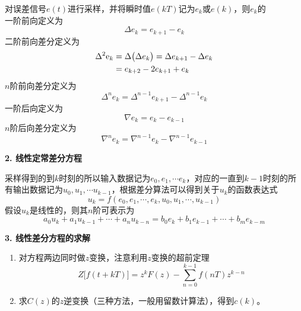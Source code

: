 对误差信号$e(t)$进行采样，并将瞬时值$e(kT)$记为$e_k$或$e(k)$，则$e_k$的\\[0.5em]
一阶前向定义为
\begin{equation}
	\Delta e_k = e_{k+1} - e_k
\end{equation}
二阶前向差分定义为
\begin{align}
	\Delta^2 {\rm{e}}_k &= \Delta\big(\Delta e_k\big) = \Delta e_{k+1} - \Delta e_k \notag\\
	&=e_{k+2} - 2e_{k+1}  + e_k
\end{align}
$n$阶前向差分定义为
\begin{equation}
	\Delta^n e_k = \Delta^{n-1}e_{k+1} - \Delta^{n-1}e_k
\end{equation}
一阶后向定义为
\begin{equation}
	\nabla e_k = e_{k} - e_{k-1}
\end{equation}
$n$阶后向差分定义为
\begin{equation}
	\nabla^n e_k = \nabla^{n-1}e_{k} - \nabla^{n-1}e_{k-1}
\end{equation}

\noindent \textbf{2. 线性定常差分方程}

采样得到的到$k$时刻的所以输入数据记为$e_0,e_1,\cdots e_k$，对应的一直到$k-1$时刻的所有输出数据记为$u_0,u_1,\cdots u_{k-1}$，根据差分算法可以得到关于$u_k$的函数表达式
\begin{equation}
	u_k = f(e_0,e_1,\cdots, e_k,u_0,u_1,\cdots, u_{k-1})
\end{equation}
假设$u_k$是线性的，则其$n$阶可表示为
\begin{equation}
	a_0u_k+a_1u_{k-1}+\cdots+a_nu_{k-n} = b_0e_k+b_1e_{k-1}+\cdots + b_me_{k-m}
\end{equation}

\noindent \textbf{3. 线性差分方程的求解}

\example[求解线性差分方程]\vspace*{0.5em}
\noindent  \hspace*{0.2em}  \hspace{1.5em}
\vspace*{0.5em}
\begin{enumerate}
	\item 对方程两边同时做$z$变换，注意利用$z$变换的超前定理
	\[
	Z\big[f(t+kT)\big] = z^kF(z) - \sum_{n = 0}^{k - 1} f(nT)z^{k-n}
	\]
	\item 求$C(z)$的$z$逆变换（三种方法，一般用留数计算法），得到$c(k)$。
\end{enumerate}

